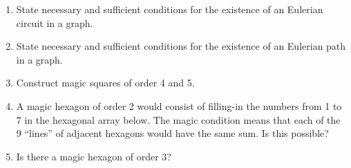 \begin{enumerate}
\workbookpagebreak

\item State necessary and sufficient conditions for the existence of
an Eulerian circuit in a graph.  

\wbvfill

\item  State necessary and sufficient conditions for the existence of
an Eulerian path in a graph.  

\wbvfill

\newpage

\item Construct magic squares of order 4 and 5.

\wbvfill

\workbookpagebreak

\item A magic hexagon of order 2 would consist of filling-in
the numbers from 1 to 7 in the hexagonal array below.  The magic
condition means that each of the 9 ``lines'' of adjacent hexagons
would have the same sum.  Is this possible?

\begin{center}

\end{center}

\wbvfill

\item Is there a magic hexagon of order 3?

\wbvfill

\end{enumerate}





